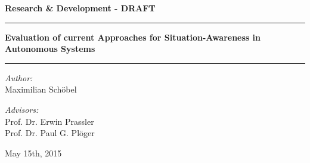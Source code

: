 \documentclass{scrartcl}
\begin{document}
\begin{center}
\LARGE
\textbf{Research \& Development - DRAFT}

\vspace{2cm}

\rule{\linewidth}{2pt}
\textbf{Evaluation of current Approaches for Situation-Awareness in Autonomous Systems} \\
\rule{\linewidth}{2pt}
\bigskip

\normalsize
\textit{Author:}\\
Maximilian Schöbel
\bigskip

\textit{Advisors:}\\
Prof. Dr. Erwin Prassler\\
Prof. Dr. Paul G. Plöger

\vspace{4cm}
May 15th, 2015
\end{center}

\newpage

\tableofcontents

\newpage







\newpage

\printbibliography
\end{document}
